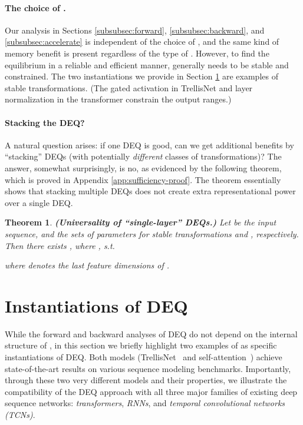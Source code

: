 \documentclass{article}
\newtheorem{theorem}{Theorem}
\begin{document}
\paragraph{The choice of .} Our analysis in Sections \ref{subsubsec:forward}, \ref{subsubsec:backward}, and \ref{subsubsec:accelerate} is independent of the choice of , and the same kind of memory benefit is present regardless of the type of . However, to find the equilibrium in a reliable and efficient manner, generally  needs to be stable and constrained. The two instantiations we provide in Section \ref{sec:instantiations} are examples of stable transformations. (The gated activation in TrellisNet and layer normalization in the transformer constrain the output ranges.)
\vspace{-2mm}

\paragraph{Stacking the DEQ?} A natural question arises: if one DEQ is good, can we get additional benefits by ``stacking'' DEQs (with potentially \emph{different} classes of transformations)? The answer, somewhat surprisingly, is no, as evidenced by the following theorem, which is proved in Appendix \ref{app:sufficiency-proof}. The theorem essentially shows that stacking multiple DEQs does not create extra representational power over a single DEQ.

\begin{theorem}
\label{thm:stack-deq}
\textbf{(Universality of ``single-layer'' DEQs.)} Let  be the input sequence, and  the sets of parameters for stable transformations  and , respectively. Then there exists , where , s.t.

where  denotes the last  feature dimensions of .
\end{theorem}

\section{Instantiations of DEQ}
\label{sec:instantiations}

While the forward and backward analyses of DEQ do not depend on the internal structure of , in this section we briefly highlight two examples of  as specific instantiations of DEQ. Both models (TrellisNet~\citep{bai2018trellis} and self-attention~\citep{vaswani2017attention,dehghani2018universal}) achieve state-of-the-art results on various sequence modeling benchmarks. Importantly, through these two very different models and their properties, we illustrate the compatibility of the DEQ approach with all three major families of existing deep sequence networks: \emph{transformers}, \emph{RNNs}, and \emph{temporal convolutional networks (TCNs)}.
\vspace{-2mm}
\end{document}
